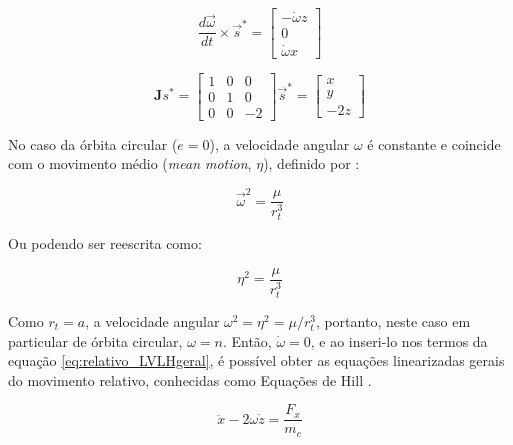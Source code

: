 \begin{equation}
\label{eq:dOmega_cross_s}
\frac{d\vec\omega}{dt} \times \vec s^*
=
\begin{bmatrix}
-\dot\omega z \\
0              \\
\dot\omega x
\end{bmatrix}
\end{equation}

\begin{equation}
\label{eq:jacobiana_LVLH}
\mathbf Js^*
=
\begin{bmatrix}
    1 & 0 & 0 \\
    0 & 1 & 0  \\
    0 & 0 & -2
\end{bmatrix}
\vec s^*
=
\begin{bmatrix}
x \\
y \\
-2z
\end{bmatrix}
\end{equation}

No caso da órbita circular ($e=0$), a velocidade angular
$\omega$ é constante e coincide com o movimento médio (\emph{mean motion}, $\eta$), definido por \cite{fehse2003}:

\begin{equation}
\label{eq:omega_constante1}
\vec\omega^2 = \frac{\mu}{r_t^3}
\end{equation}

Ou podendo ser reescrita como:

\begin{equation}
\label{eq:omega_constante2}
\eta^2 = \frac{\mu}{r_t^3}
\end{equation}

Como $r_t=a$, a velocidade angular $\omega^{2}= \eta^2 = \mu/r_t^{3}$, portanto, neste caso em particular de órbita circular, $\omega=n$.
Então, $\dot{\omega}=0$, e ao inseri-lo nos termos da equação \eqref{eq:relativo_LVLHgeral}, é possível obter as equações linearizadas gerais do movimento relativo, conhecidas como Equações de Hill \cite{hill1878,fehse2003, wie2008space}.

\begin{equation}
    \label{eq:equacoes_HillX}
\ddot{x} - 2\omega \dot{z} = \frac{F_x}{m_c}
\end{equation}

